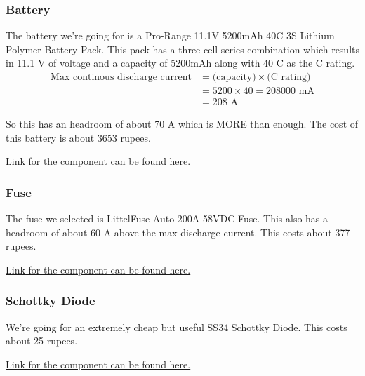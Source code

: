 \documentclass[12pt]{article}
\begin{document}
\subsubsection*{Battery}
The battery we're going for is a Pro-Range 11.1V 5200mAh 40C 3S Lithium Polymer Battery Pack. 
\newline
This pack has a three cell series combination which results in 11.1 V of voltage and a capacity of 5200mAh along with 40 C as the C rating.
\begin{align*}
    \text{Max continous discharge current} &= \text{(capacity)}\times\text{(C rating)}\\
    &= 5200 \times 40 = 208000\text{ mA}\\
    &= 208\text{ A}
\end{align*}

So this has an headroom of about 70 A which is MORE than enough. The cost of this battery is about 3653 rupees.

\href{https://robu.in/product/pro-range-5200mah-3s-40c80c-lithium-polymer-battery-pack-lipo/}{Link for the component can be found here.}


\subsubsection*{Fuse}
The fuse we selected is LittelFuse Auto 200A 58VDC Fuse. This also has a headroom of about 60 A above the max discharge current. This costs about 377 rupees.

\href{https://www.digikey.in/en/products/detail/littelfuse-inc/142.5631.6202/2515909?gad_source=1&gad_campaignid=20498599563&gbraid=0AAAAADrbLljJD7EDQKu9e9nLQij0boGQ3&gclid=CjwKCAjw_pDBBhBMEiwAmY02NlW6MqK-9fe1ue4tsHIFhOGmYJwIuewU8G1YjnB5rM2lacEHPa4Z9hoCnioQAvD_BwE&gclsrc=aw.ds}{Link for the component can be found here.}

\subsubsection*{Schottky Diode}
We're going for an extremely cheap but useful SS34 Schottky Diode. This costs about 25 rupees.

\href{https://robu.in/product/ss34-schottky-diode-for-high-speed-switching-pack-of-2/?gad_source=1&gad_campaignid=17427802703&gbraid=0AAAAADvLFWebM7-G2QsFY7UCdjSACyQJK&gclid=CjwKCAjw_pDBBhBMEiwAmY02Ng7v65L4U7x7HYcmHqhfgriCHJnP5DWrVZJornA1QMzXB2dP9AnKdRoC5OUQAvD_BwE}{Link for the component can be found here.}
\end{document}

